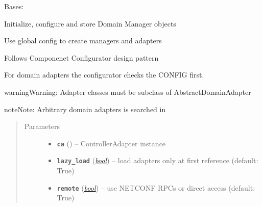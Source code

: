 \documentclass[letterpaper,10pt,english]{sphinxmanual}
\begin{document}
\begin{fulllineitems}
\label{adapt/adaptation:escape.adapt.adaptation.DomainConfigurator}
Bases: \href{https://docs.python.org/2.7/library/functions.html\#object}{}

Initialize, configure and store Domain Manager objects

Use global config to create managers and adapters

Follows Componenet Configurator design pattern

\begin{fulllineitems}
\label{adapt/adaptation:escape.adapt.adaptation.DomainConfigurator.__init__}
For domain adapters the configurator checks the CONFIG first.

\begin{notice}{warning}{Warning:}
Adapter classes must be subclass of AbstractDomainAdapter
\end{notice}

\begin{notice}{note}{Note:}
Arbitrary domain adapters is searched in
{\hyperref[adapt/domain_adapters:module-escape.adapt.domain_adapters]{\emph{}}}
\end{notice}
\begin{quote}\begin{description}
\item[{Parameters}] \leavevmode\begin{itemize}
\item {} 
\textbf{\texttt{ca}} ({\hyperref[adapt/adaptation:escape.adapt.adaptation.ControllerAdapter]{\emph{}}}) -- ControllerAdapter instance

\item {} 
\textbf{\texttt{lazy\_load}} (\href{https://docs.python.org/2.7/library/functions.html\#bool}{\emph{bool}}) -- load adapters only at first reference (default: True)

\item {} 
\textbf{\texttt{remote}} (\href{https://docs.python.org/2.7/library/functions.html\#bool}{\emph{bool}}) -- use NETCONF RPCs or direct access (default: True)


\end{itemize}
\end{description}
\end{quote}
\end{fulllineitems}
\end{fulllineitems}
\end{document}
